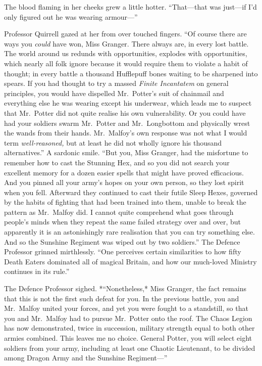 The blood flaming in her cheeks grew a little hotter. ``That---that was
just---if I'd only figured out he was wearing armour---''

Professor Quirrell gazed at her from over touched fingers. ``Of course
there are ways you \emph{could} have won, Miss Granger. There always
are, in every lost battle. The world around us redunds with
opportunities, explodes with opportunities, which nearly all folk ignore
because it would require them to violate a habit of thought; in every
battle a thousand Hufflepuff bones waiting to be sharpened into spears.
If you had thought to try a massed \emph{Finite Incantatem} on general
principles, you would have dispelled Mr.~Potter's suit of chainmail and
everything else he was wearing except his underwear, which leads me to
suspect that Mr.~Potter did not quite realise his own vulnerability. Or
you could have had your soldiers swarm Mr.~Potter and Mr.~Longbottom and
physically wrest the wands from their hands. Mr.~Malfoy's own response
was not what I would term \emph{well-reasoned,} but at least he did not
wholly ignore his thousand alternatives.'' A sardonic smile. ``But you,
Miss Granger, had the misfortune to remember how to cast the Stunning
Hex, and so you did not search your excellent memory for a dozen easier
spells that might have proved efficacious. And you pinned all your
army's hopes on your own person, so they lost spirit when you fell.
Afterward they continued to cast their futile Sleep Hexes, governed by
the habits of fighting that had been trained into them, unable to break
the pattern as Mr.~Malfoy did. I cannot quite comprehend what goes
through people's minds when they repeat the same failed strategy over
and over, but apparently it is an astonishingly rare realisation that
you can try something else. And so the Sunshine Regiment was wiped out
by two soldiers.'' The Defence Professor grinned mirthlessly. ``One
perceives certain similarities to how fifty Death Eaters dominated all
of magical Britain, and how our much-loved Ministry continues in its
rule.''

The Defence Professor sighed. *``Nonetheless,* Miss Granger, the fact
remains that this is not the first such defeat for you. In the previous
battle, you and Mr.~Malfoy united your forces, and yet you were fought
to a standstill, so that you and Mr.~Malfoy had to pursue Mr.~Potter
onto the roof. The Chaos Legion has now demonstrated, twice in
succession, military strength equal to both other armies combined. This
leaves me no choice. General Potter, you will select eight soldiers from
your army, including at least one Chaotic Lieutenant, to be divided
among Dragon Army and the Sunshine Regiment---''

